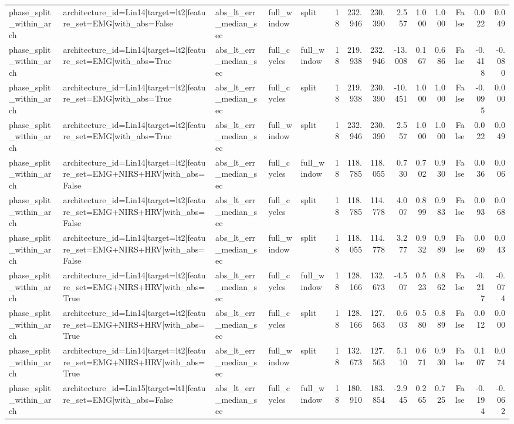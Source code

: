 \begin{table}
\begin{tabular}{lllllrrrrrrrrr}
phase_split_within_arch & architecture_id=Lin14|target=lt2|feature_set=EMG|with_abs=False & abs_lt_err_median_sec & full_window & split & 18 & 232.946 & 230.390 & 2.557 & 1.000 & 1.000 & False & 0.022 & 0.049 \\
phase_split_within_arch & architecture_id=Lin14|target=lt2|feature_set=EMG|with_abs=True & abs_lt_err_median_sec & full_cycles & full_window & 18 & 219.938 & 232.946 & -13.008 & 0.167 & 0.686 & False & -0.418 & -0.080 \\
phase_split_within_arch & architecture_id=Lin14|target=lt2|feature_set=EMG|with_abs=True & abs_lt_err_median_sec & full_cycles & split & 18 & 219.938 & 230.390 & -10.451 & 1.000 & 1.000 & False & -0.095 & 0.000 \\
phase_split_within_arch & architecture_id=Lin14|target=lt2|feature_set=EMG|with_abs=True & abs_lt_err_median_sec & full_window & split & 18 & 232.946 & 230.390 & 2.557 & 1.000 & 1.000 & False & 0.022 & 0.049 \\
phase_split_within_arch & architecture_id=Lin14|target=lt2|feature_set=EMG+NIRS+HRV|with_abs=False & abs_lt_err_median_sec & full_cycles & full_window & 18 & 118.785 & 118.055 & 0.730 & 0.702 & 0.930 & False & 0.036 & 0.006 \\
phase_split_within_arch & architecture_id=Lin14|target=lt2|feature_set=EMG+NIRS+HRV|with_abs=False & abs_lt_err_median_sec & full_cycles & split & 18 & 118.785 & 114.778 & 4.007 & 0.899 & 0.983 & False & 0.093 & 0.068 \\
phase_split_within_arch & architecture_id=Lin14|target=lt2|feature_set=EMG+NIRS+HRV|with_abs=False & abs_lt_err_median_sec & full_window & split & 18 & 118.055 & 114.778 & 3.277 & 0.932 & 0.989 & False & 0.069 & 0.043 \\
phase_split_within_arch & architecture_id=Lin14|target=lt2|feature_set=EMG+NIRS+HRV|with_abs=True & abs_lt_err_median_sec & full_cycles & full_window & 18 & 128.166 & 132.673 & -4.507 & 0.523 & 0.862 & False & -0.217 & -0.074 \\
phase_split_within_arch & architecture_id=Lin14|target=lt2|feature_set=EMG+NIRS+HRV|with_abs=True & abs_lt_err_median_sec & full_cycles & split & 18 & 128.166 & 127.563 & 0.603 & 0.580 & 0.889 & False & 0.012 & 0.000 \\
phase_split_within_arch & architecture_id=Lin14|target=lt2|feature_set=EMG+NIRS+HRV|with_abs=True & abs_lt_err_median_sec & full_window & split & 18 & 132.673 & 127.563 & 5.110 & 0.671 & 0.930 & False & 0.107 & 0.074 \\
phase_split_within_arch & architecture_id=Lin15|target=lt1|feature_set=EMG|with_abs=False & abs_lt_err_median_sec & full_cycles & full_window & 18 & 180.910 & 183.854 & -2.945 & 0.265 & 0.725 & False & -0.194 & -0.062 \\

\end{tabular}
\end{table}
